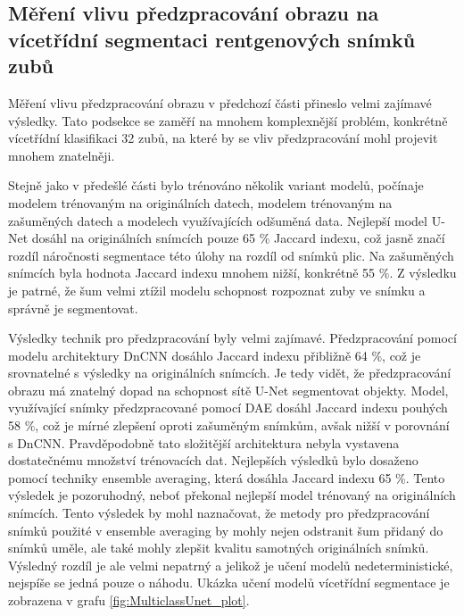 \documentclass[male,czech,api_ing]{thesis}
\begin{document}
\subsection{Měření vlivu předzpracování obrazu na vícetřídní segmentaci rentgenových snímků zubů}
Měření vlivu předzpracování obrazu v předchozí části přineslo velmi zajímavé výsledky. Tato podsekce se zaměří na mnohem komplexnější problém, konkrétně vícetřídní klasifikaci 32 zubů, na které by se vliv předzpracování mohl projevit mnohem znatelněji.

Stejně jako v předešlé části bylo trénováno několik variant modelů, počínaje modelem trénovaným na originálních datech, modelem trénovaným na zašuměných datech a modelech využívajících odšuměná data. Nejlepší model U-Net dosáhl na originálních snímcích pouze 65 \% Jaccard indexu, což jasně značí rozdíl náročnosti segmentace této úlohy na rozdíl od snímků plic. Na zašuměných snímcích byla hodnota Jaccard indexu mnohem nižší, konkrétně 55 \%. Z výsledku je patrné, že šum velmi ztížil modelu schopnost rozpoznat zuby ve snímku a správně je segmentovat.

Výsledky technik pro předzpracování byly velmi zajímavé. Předzpracování pomocí modelu architektury DnCNN dosáhlo Jaccard indexu přibližně 64 \%, což je srovnatelné s výsledky na originálních snímcích. Je tedy vidět, že předzpracování obrazu má znatelný dopad na schopnost sítě U-Net segmentovat objekty. Model, využívající snímky předzpracované pomocí DAE dosáhl Jaccard indexu pouhých 58 \%, což je mírné zlepšení oproti zašuměným snímkům, avšak nižší v porovnání s DnCNN. Pravděpodobně tato složitější architektura nebyla vystavena dostatečnému množství trénovacích dat. Nejlepších výsledků bylo dosaženo pomocí techniky ensemble averaging, která dosáhla Jaccard indexu 65 \%. Tento výsledek je pozoruhodný, neboť překonal nejlepší model trénovaný na originálních snímcích. Tento výsledek by mohl naznačovat, že metody pro předzpracování snímků použité v ensemble averaging by mohly nejen odstranit šum přidaný do snímků uměle, ale také mohly zlepšit kvalitu samotných originálních snímků. Výsledný rozdíl je ale velmi nepatrný a jelikož je učení modelů nedeterministické, nejspíše se jedná pouze o náhodu. Ukázka učení modelů vícetřídní segmentace je zobrazena v grafu \ref{fig:MulticlassUnet_plot}.
\end{document}
